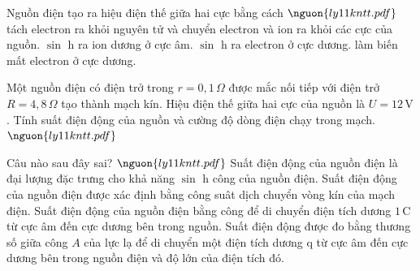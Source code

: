 \begin{ex}
Nguồn điện tạo ra hiệu điện thế giữa hai cực bằng cách $\nguon{ly11 kntt.pdf}$
\choice
{\True tách electron ra khỏi nguyên tử và chuyển electron và ion ra khỏi các cực của nguồn.}
{$\sin$ h ra ion dương ở cực âm.}
{$\sin$ h ra electron ở cực dương.}
{làm biến mất electron ở cực dương.}
\end{ex}

\begin{bt}
Một nguồn điện có điện trở trong $r=0,1\,\Omega$ được mắc nối tiếp với điện trở $R=4,8\,\Omega$ tạo thành mạch kín. Hiệu điện thế giữa hai cực của nguồn là $U=12\,\mathrm{V}$. Tính suất điện động của nguồn và cường độ dòng điện chạy trong mạch. $\nguon{ly11 kntt.pdf}$
\end{bt}

\begin{ex}
Câu nào sau đây sai? $\nguon{ly11 kntt.pdf}$
\choice
{Suất điện động của nguồn điện là đại lượng đặc trưng cho khả năng $\sin$ h công của nguồn điện.}
{\True Suất điện động của nguồn điện được xác định bằng công suât dịch chuyển vòng kín của mạch điện.}
{Suất điện động của nguồn điện bằng công để di chuyển điện tích dương $1\,\mathrm{C}$ từ cực âm đến cực dương bên trong nguồn.}
{Suất điện động được đo bằng thương số giữa công $A$ của lực lạ để di chuyển một điện tích dương q từ cực âm đến cực dương bên trong nguồn điện và độ lớn của điện tích đó.}
\end{ex}

